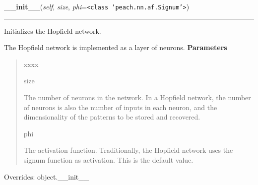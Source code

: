 \hspace{.8\funcindent}\begin{boxedminipage}{\funcwidth}

    \raggedright \textbf{\_\_init\_\_}(\textit{self}, \textit{size}, \textit{phi}={\tt {\textless}class 'peach.nn.af.Signum'{\textgreater}})

    \vspace{-1.5ex}

    \rule{\textwidth}{0.5\fboxrule}
\setlength{\parskip}{2ex}

Initializes the Hopfield network.

The Hopfield network is implemented as a layer of neurons.
\setlength{\parskip}{1ex}
      \textbf{Parameters}
      \vspace{-1ex}

      \begin{quote}
        \begin{Ventry}{xxxx}

          \item[size]


The number of neurons in the network. In a Hopfield network, the
number of neurons is also the number of inputs in each neuron, and
the dimensionality of the patterns to be stored and recovered.
          \item[phi]


The activation function. Traditionally, the Hopfield network uses
the signum function as activation. This is the default value.
        \end{Ventry}

      \end{quote}

      Overrides: object.\_\_init\_\_

    \end{boxedminipage}

    \label{peach:nn:mem:Hopfield:learn}

    \vspace{0.5ex}

